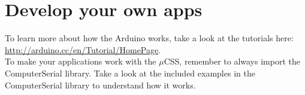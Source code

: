 	\section{Develop your own apps}
	To learn more about how the Arduino works, take a look at the tutorials here: \url{http://arduino.cc/en/Tutorial/HomePage}.\\
	
	To make your applications work with the $\mu$CSS, remember to always import the ComputerSerial library. Take a look at the included examples in the ComputerSerial library to understand how it works.